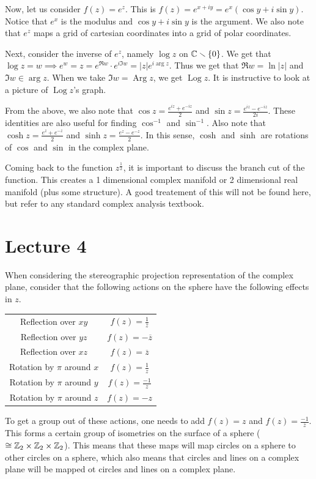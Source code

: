 \documentclass[11pt,leqno,oneside]{amsart}
\newcommand{\Arg}{\operatorname{Arg}}
\newcommand{\Log}{\operatorname{Log}}
\begin{document}
Now, let us consider $f(z) = e^z$. This is $f(z) = e^{x+iy} = e^x(\cos y +
i\sin y)$. Notice that $e^x$ is the modulus and $\cos y + i \sin y$ is the
argument. We also note that $e^z$ maps a grid of cartesian coordinates into a
grid of polar coordinates.

Next, consider the inverse of $e^z$, namely $\log z$ on ${\mathbb C} \smallsetminus
\{0\}$. We get that $\log z = w \implies e^w = z = e^{\Re w} \cdot e^{i \Im w}
= |z|e^{i \arg z}$. Thus we get that $\Re w = \ln|z|$ and $\Im w \in \arg z$.
When we take $\Im w = \Arg z$, we get $\Log z$. It is instructive to look at a
picture of $\Log z$'s graph.

From the above, we also note that $\cos z = \frac{e^{iz}+e^{-iz}}{2}$ and $\sin
z = \frac{e^{iz}-e^{-iz}}{2i}$. These identities are also useful for finding
$\cos^{-1}$ and $\sin^{-1}$. Also note that $\cosh z = \frac{e^z+e^{-z}}{2}$
and $\sinh z = \frac{e^z-e^{-z}}{2}$. In this sense, $\cosh$ and $\sinh$ are
rotations of $\cos$ and $\sin$ in the complex plane.

Coming back to the function $z^{\frac{1}{2}}$, it is important to discuss the
branch cut of the function. This creates a 1 dimensional complex manifold or
2 dimensional real manifold (plus some structure). A good treatement of this
will not be found here, but refer to any standard complex analysis textbook.

\section{Lecture 4}
When considering the stereographic projection representation of the complex
plane, consider that the following actions on the sphere have the following
effects in $z$.

\begin{tabular}{|c|c|}
    \hline
    Reflection over $xy$ & $f(z) = \frac{1}{\overline{z}}$ \\
    Reflection over $yz$ & $f(z) = -\overline{z}$ \\
    Reflection over $xz$ & $f(z) = \overline{z}$ \\
    Rotation by $\pi$ around $x$ & $f(z) = \frac{1}{z}$ \\
    Rotation by $\pi$ around $y$ & $f(z) = \frac{-1}{z}$ \\
    Rotation by $\pi$ around $z$ & $f(z) = -z$ \\
    \hline
\end{tabular}

To get a group out of these actions, one needs to add $f(z) = z$ and $f(z) =
\frac{-1}{\overline{z}}$. This forms a certain group of isometries on the
surface of a sphere ($\cong {\mathbb Z}_2 \times {\mathbb Z}_2 \times {\mathbb Z}_2$). This means that
these maps will map circles on a sphere to other circles on a sphere, which
also means that circles and lines on a complex plane will be mapped ot circles
and lines on a complex plane.
\end{document}
